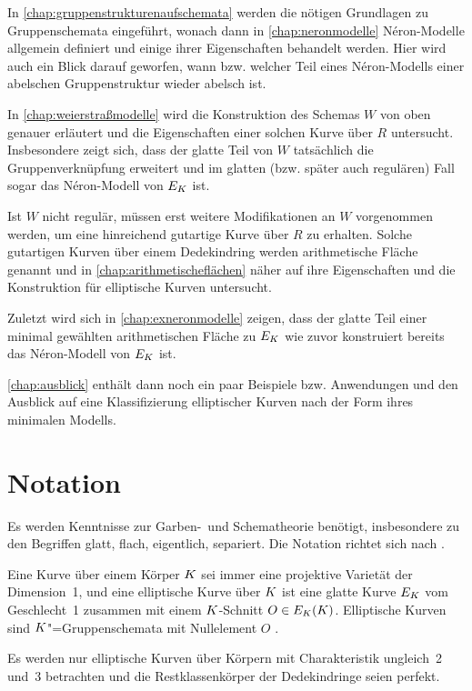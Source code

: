 In \autoref{chap:gruppenstrukturenaufschemata} werden die nötigen
Grundlagen zu Gruppenschemata eingeführt, wonach dann in
\autoref{chap:neronmodelle} Néron-Modelle allgemein definiert und
einige ihrer Eigenschaften behandelt werden.
Hier wird auch ein Blick darauf geworfen, wann bzw. welcher Teil eines
Néron-Modells einer abelschen Gruppenstruktur wieder abelsch ist.

In \autoref{chap:weierstraßmodelle} wird die Konstruktion des Schemas
$W$ von oben genauer erläutert und die Eigenschaften einer solchen
Kurve über $R$ untersucht. Insbesondere zeigt sich, dass der glatte
Teil von $W$ tatsächlich die Gruppenverknüpfung erweitert 
und im glatten (bzw. später auch regulären) Fall sogar das
Néron-Modell von $E_{K}$ ist.

Ist $W$ nicht regulär, müssen erst weitere Modifikationen an $W$
vorgenommen werden, um eine hinreichend gutartige Kurve über $R$ zu
erhalten. Solche gutartigen Kurven über einem Dedekindring werden
arithmetische Fläche genannt und in
\autoref{chap:arithmetischeflächen} näher auf ihre Eigenschaften und
die Konstruktion für elliptische Kurven untersucht.

Zuletzt wird sich in \autoref{chap:exneronmodelle} zeigen, dass der
glatte Teil einer minimal gewählten arithmetischen Fläche zu $E_{K}$
wie zuvor konstruiert bereits das Néron-Modell von $E_{K}$ ist.

\autoref{chap:ausblick} enthält dann noch ein paar Beispiele
bzw. Anwendungen und den Ausblick auf eine Klassifizierung
elliptischer Kurven nach der Form ihres minimalen Modells.

\section*{Notation}
Es werden Kenntnisse zur Garben-~und Schematheorie benötigt,
insbesondere zu den Begriffen glatt, flach, eigentlich, separiert.
Die Notation richtet sich nach \cite{wedhorn}.

Eine Kurve über einem Körper $K$ sei immer eine projektive Varietät
der Dimension~1,
und eine elliptische Kurve über $K$ ist eine glatte Kurve $E_{K}$
vom Geschlecht~1 zusammen mit einem $K$-Schnitt $O\in E_{K}(K)$.
Elliptische Kurven sind $K$"=Gruppenschemata mit Nullelement $O$
\cite{silverman}.

Es werden nur elliptische Kurven über Körpern mit Charakteristik
ungleich~2 und~3 betrachten und die Restklassenkörper der
Dedekindringe seien perfekt.

